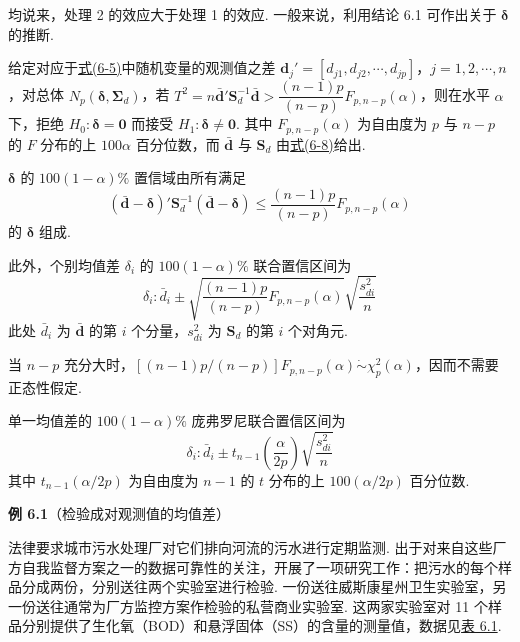 均说来，处理 2 的效应大于处理 1 的效应. 一般来说，利用结论 6.1 可作出关于 $\boldsymbol{\delta}$ 的推断.

\begin{mvbox}
给定对应于\hyperref[eq:6-5]{式(6-5)}中随机变量的观测值之差 $\mathbf{d}_j'=[d_{j1},d_{j2},\cdots,d_{jp}]$，$j=1,2,\cdots,n$，对总体 $N_p(\boldsymbol{\delta},\boldsymbol{\Sigma}_d)$，若 $T^2=n\bar{\mathbf{d}}'\mathbf{S}_d^{-1}\bar{\mathbf{d}}>\dfrac{(n-1)p}{(n-p)}F_{p,n-p}(\alpha)$，则在水平 $\alpha$ 下，拒绝 $H_0: \boldsymbol{\delta}=\mathbf{0}$ 而接受 $H_1: \boldsymbol{\delta}\neq\mathbf{0}$. 其中 $F_{p,n-p}(\alpha)$ 为自由度为 $p$ 与 $n-p$ 的 $F$ 分布的上 $100\alpha$ 百分位数，而 $\bar{\mathbf{d}}$ 与 $\mathbf{S}_d$ 由\hyperref[eq:6-8]{式(6-8)}给出.

$\boldsymbol{\delta}$ 的 $100(1-\alpha)\%$ 置信域由所有满足
\label{eq:6-9}
\begin{equation}
(\bar{\mathbf{d}}-\boldsymbol{\delta})'\mathbf{S}_d^{-1}(\bar{\mathbf{d}}-\boldsymbol{\delta})\leqslant\frac{(n-1)p}{(n-p)}F_{p,n-p}(\alpha) \tag{6-9}
\end{equation}
的 $\boldsymbol{\delta}$ 组成.

此外，个别均值差 $\delta_i$ 的 $100(1-\alpha)\%$ 联合置信区间为
\label{eq:6-10}
\begin{equation}
\delta_i: \bar{d}_i\pm\sqrt{\frac{(n-1)p}{(n-p)}F_{p,n-p}(\alpha)}\sqrt{\frac{s_{di}^2}{n}} \tag{6-10}
\end{equation}
此处 $\bar{d}_i$ 为 $\bar{\mathbf{d}}$ 的第 $i$ 个分量，$s_{di}^2$ 为 $\mathbf{S}_d$ 的第 $i$ 个对角元.

当 $n-p$ 充分大时，$\left[(n-1)p/(n-p)\right]F_{p,n-p}(\alpha)\dot{\sim}\chi_p^2(\alpha)$，因而不需要正态性假定.

单一均值差的 $100(1-\alpha)\%$ 庞弗罗尼联合置信区间为
\label{eq:6-10a}
\begin{equation}
\delta_i: \bar{d}_i\pm t_{n-1}\left(\frac{\alpha}{2p}\right)\sqrt{\frac{s_{di}^2}{n}} \tag{6-10a}
\end{equation}
其中 $t_{n-1}(\alpha/2p)$ 为自由度为 $n-1$ 的 $t$ 分布的上 $100(\alpha/2p)$ 百分位数.
\end{mvbox}

\noindent\textbf{例 6.1}\quad （检验成对观测值的均值差）

法律要求城市污水处理厂对它们排向河流的污水进行定期监测. 出于对来自这些厂方自我监督方案之一的数据可靠性的关注，开展了一项研究工作：把污水的每个样品分成两份，分别送往两个实验室进行检验. 一份送往威斯康星州卫生实验室，另一份送往通常为厂方监控方案作检验的私营商业实验室. 这两家实验室对 11 个样品分别提供了生化氧（BOD）和悬浮固体（SS）的含量的测量值，数据见\hyperref[tab:6.1]{表 6.1}.

